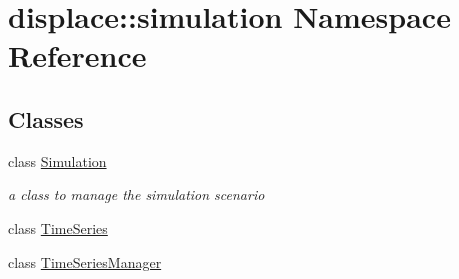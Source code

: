 \hypertarget{namespacedisplace_1_1simulation}{}\section{displace\+::simulation Namespace Reference}
\label{namespacedisplace_1_1simulation}
\subsection*{Classes}
\begin{DoxyCompactItemize}
\item 
class \mbox{\hyperlink{classdisplace_1_1simulation_1_1_simulation}{Simulation}}
\begin{DoxyCompactList}\small\item\em a class to manage the simulation scenario \end{DoxyCompactList}\item 
class \mbox{\hyperlink{classdisplace_1_1simulation_1_1_time_series}{Time\+Series}}
\item 
class \mbox{\hyperlink{classdisplace_1_1simulation_1_1_time_series_manager}{Time\+Series\+Manager}}
\end{DoxyCompactItemize}
